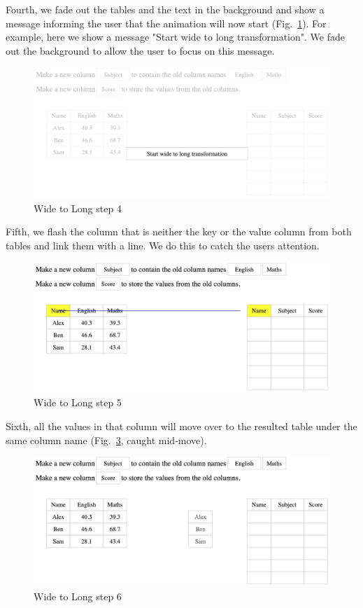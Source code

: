 Fourth, we fade out the tables and the text in the background and show a message informing the user that the animation will now start (Fig.~\ref{fig:gather4}). For example, here we show a message "Start wide to long transformation". We fade out the background to allow the user to focus on this message.
\begin{figure}[H]
    \includegraphics[scale = 0.35]{Masters-Thesis/img/gather4.png}
    \caption{Wide to Long step 4}
    \label{fig:gather4}
\end{figure}

\newpage
Fifth, we flash the column that is neither the key or the value column from both tables and link them with a line. We do this to catch the users attention.
\begin{figure}[H]
    \includegraphics[scale = 0.35]{Masters-Thesis/img/gather5.png}
    \caption{Wide to Long step 5}
    \label{fig:gather5}
\end{figure}

Sixth, all the values in that column will move over to the resulted table under the same column name (Fig.~\ref{fig:gather6}, caught mid-move).
\begin{figure}[H]
    \includegraphics[scale = 0.35]{Masters-Thesis/img/gather6.png}
    \caption{Wide to Long step 6}
    \label{fig:gather6}
\end{figure}

